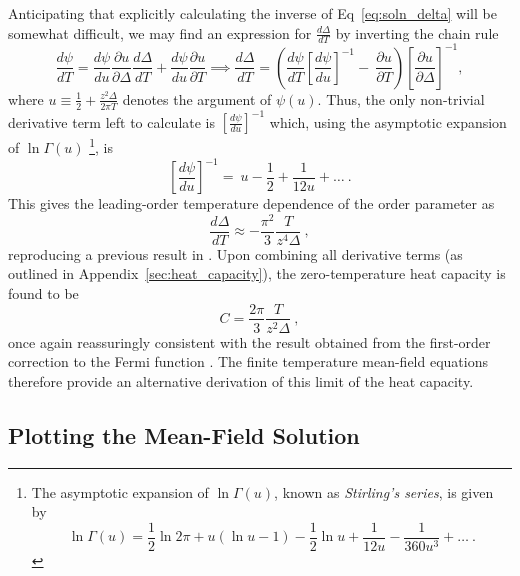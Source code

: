 Anticipating that explicitly calculating the inverse of Eq~\eqref{eq:soln_delta} will be somewhat difficult, we may find an expression for $ \frac{d \Delta}{d T} $ by inverting the chain rule
\begin{equation}
\frac{d \psi}{dT} = \frac{d \psi}{du} \frac{\partial u}{\partial \Delta} \frac{d \Delta}{d T} + \frac{d \psi}{du} \frac{\partial u}{\partial T} \implies \frac{d \Delta}{d T} = \left( \frac{d \psi}{dT} \left[ \frac{d \psi}{d u} \right]^{-1} - ~ \frac{\partial u}{\partial T} \right) \left[ \frac{\partial u}{\partial \Delta} \right]^{-1},
\end{equation}
where $ u \equiv \frac{1}{2} + \frac{z^2 \Delta}{2 \pi T} $ denotes the argument of $ \psi(u) $. Thus, the only non-trivial derivative term left to calculate is $ \left[ \frac{d \psi}{d u} \right]^{-1} $ which, using the asymptotic expansion of $ \ln{\Gamma(u)} $ \footnote{The asymptotic expansion of $ \ln{\Gamma(u)} $, known as \textit{Stirling's series}, is given by \cite{MathematicalFunctions} $$ \ln{\Gamma(u)} = \frac{1}{2} \ln{2 \pi} + u (\ln{u} - 1) - \frac{1}{2} \ln{u} + \frac{1}{12u} - \frac{1}{360 u^3} + \ldots ~. $$}, is $$ \left[ \frac{d \psi}{du} \right]^{-1} = ~ u - \frac{1}{2} + \frac{1}{12 u} + \ldots ~ . $$ This gives the leading-order temperature dependence of the order parameter as
\begin{equation}
\frac{d \Delta}{d T} \approx - \frac{\pi^2}{3} \frac{T}{z^4 \Delta} ~ ,
\label{eq:delta_derivative}
\end{equation}
reproducing a previous result in \cite{Draft}. Upon combining all derivative terms (as outlined in Appendix~\ref{sec:heat_capacity}), the zero-temperature heat capacity is found to be
\begin{equation}
C = \frac{2 \pi}{3} \frac{T}{z^2 \Delta}~ ,
\label{eq:heat_capacity}
\end{equation}
once again reassuringly consistent with the result obtained from the first-order correction to the Fermi function \cite{Draft}. The finite temperature mean-field equations therefore provide an alternative derivation of this limit of the heat capacity.


\subsection{Plotting the Mean-Field Solution}

